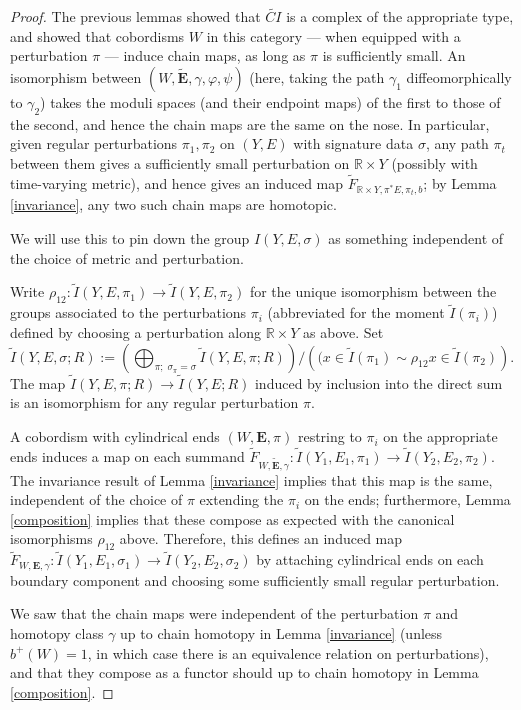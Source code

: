 \documentclass[10pt,a4paper]{amsart}
\newcommand{\pE}{\pi^* \! E}
\theoremstyle{definition}
\theoremstyle{remark}
\numberwithin{figure}{qchap}
\begin{document}
\begin{proof}The previous lemmas showed that $\widetilde{CI}$ is a complex of the appropriate type, and showed that cobordisms $W$ in this category --- when equipped with a perturbation $\pi$ --- induce chain maps, as long as $\pi$ is sufficiently small. An isomorphism between $(W,\widetilde{\mathbf{E}}, \gamma, \varphi, \psi)$ (here, taking the path $\gamma_1$ diffeomorphically to $\gamma_2$) takes the moduli spaces (and their endpoint maps) of the first to those of the second, and hence the chain maps are the same on the nose. In particular, given regular perturbations $\pi_1, \pi_2$ on $(Y,E)$ with signature data $\sigma$, any path $\pi_t$ between them gives a sufficiently small perturbation on $\mathbb R \times Y$ (possibly with time-varying metric), and hence gives an induced map $\widetilde F_{\mathbb R \times Y,\pE,\pi_t,b}$; by Lemma \ref{invariance}, any two such chain maps are homotopic. 

We will use this to pin down the group $I(Y, E, \sigma)$ as something independent of the choice of metric and perturbation. 

Write $\rho_{12}: \widetilde I(Y,E,\pi_1) \to \widetilde I(Y,E,\pi_2)$ for the unique isomorphism between the groups associated to the perturbations $\pi_i$ (abbreviated for the moment $\widetilde I(\pi_i)$) defined by choosing a perturbation along $\mathbb R \times Y$ as above. Set $$\widetilde I(Y,E,\sigma;R) := \left(\bigoplus_{\pi; \; \sigma_\pi = \sigma} \widetilde I(Y,E,\pi;R)\right)\big/\left((x \in \widetilde I(\pi_1) \sim \rho_{12} x \in \widetilde I(\pi_2)\right).$$ The map $\widetilde I(Y, E,\pi;R) \to \widetilde I(Y, E;R)$ induced by inclusion into the direct sum is an isomorphism for any regular perturbation $\pi$. 

A cobordism with cylindrical ends $(W,\mathbf{E},\pi)$ restring to $\pi_i$ on the appropriate ends induces a map on each summand $\widetilde F_{W,\widetilde{\mathbf{E}},\gamma}: \widetilde I(Y_1,E_1,\pi_1) \to \widetilde I(Y_2,E_2,\pi_2)$. The invariance result of Lemma \ref{invariance} implies that this map is the same, independent of the choice of $\pi$ extending the $\pi_i$ on the ends; furthermore, Lemma \ref{composition} implies that these compose as expected with the canonical isomorphisms $\rho_{12}$ above. Therefore, this defines an induced map $\widetilde F_{W,\mathbf{E},\gamma}: \widetilde I(Y_1, E_1, \sigma_1) \to \widetilde I(Y_2, E_2, \sigma_2)$ by attaching cylindrical ends on each boundary component and choosing some sufficiently small regular perturbation.

We saw that the chain maps were independent of the perturbation $\pi$ and homotopy class $\gamma$ up to chain homotopy in Lemma \ref{invariance} (unless $b^+(W) = 1$, in which case there is an equivalence relation on perturbations), and that they compose as a functor should up to chain homotopy in Lemma \ref{composition}.
\end{proof}
\end{document}
